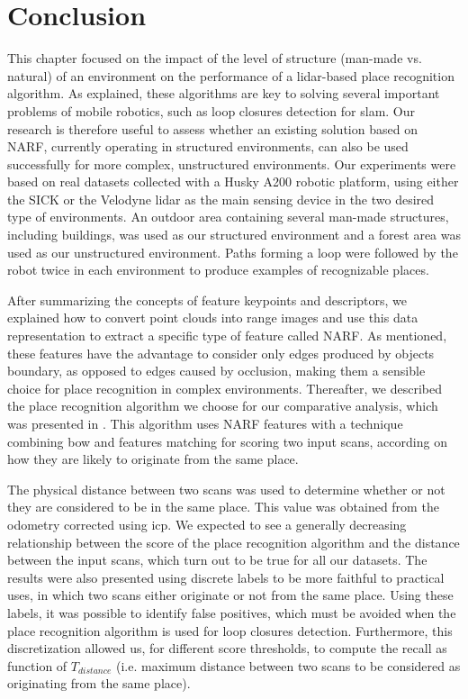 \section{Conclusion}
\label{sec:chap_slam_conclu}

This chapter focused on the impact of the level of structure (man-made vs. natural) of an environment on the performance of a \gls*{lidar}-based place recognition algorithm. As explained, these algorithms are key to solving several important problems of mobile robotics, such as loop closures detection for \gls*{slam}. Our research is therefore useful to assess whether an existing solution based on NARF, currently operating in structured environments, can also be used successfully for more complex, unstructured environments. Our experiments were based on real datasets collected with a Husky A200 robotic platform, using either the SICK or the Velodyne \gls*{lidar} as the main sensing device in the two desired type of environments. An outdoor area containing several man-made structures, including buildings, was used as our structured environment and a forest area was used as our unstructured environment. Paths forming a loop were followed by the robot twice in each environment to produce examples of recognizable places.

After summarizing the concepts of feature keypoints and descriptors, we explained how to convert point clouds into range images and use this data representation to extract a specific type of feature called NARF. As mentioned, these features have the advantage to consider only edges produced by objects boundary, as opposed to edges caused by occlusion, making them a sensible choice for place recognition in complex environments. Thereafter, we described the place recognition algorithm we choose for our comparative analysis, which was presented in \citep{Steder2011b}. This algorithm uses NARF features with a technique combining \gls*{bow} and features matching for scoring two input scans, according on how they are likely to originate from the same place. 

The physical distance between two scans was used to determine whether or not they are considered to be in the same place. This value was obtained from the odometry corrected using \gls*{icp}. We expected to see a generally decreasing relationship between the score of the place recognition algorithm and the distance between the input scans, which turn out to be true for all our datasets. The results were also presented using discrete labels to be more faithful to practical uses, in which two scans either originate or not from the same place. Using these labels, it was possible to identify false positives, which must be avoided when the place recognition algorithm is used for loop closures detection. Furthermore, this discretization allowed us, for different score thresholds, to compute the recall as function of $T_{distance}$ (i.e. maximum distance between two scans to be considered as originating from the same place).

